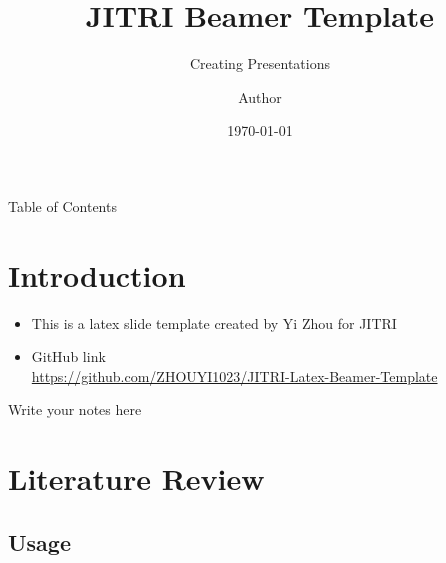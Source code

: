 \documentclass{libs/JITRI_format}
\title[JITRI Beamer Template]{\huge\textbf{JITRI Beamer Template}}
\subtitle{Creating Presentations}
\author{Author}
\institute[JITRI]{
    \normalsize{\email{author@xxx.xxx.xx}}
    \newline
    \department{Institute of Deep Perception Technology}
    \newline
    \university{Jiangsu Industrial Technology Research Institute}
}
\date{\today}
\begin{document}


\begin{frame}{}
    \maketitle
\end{frame}

\begin{frame}{Table of Contents}
    \begin{multicols}{2}
        \tableofcontents
    \end{multicols}
\end{frame}

\section{Introduction}

\begin{frame}
    \begin{itemize}[<+-| alert@+>] %
    	\item This is a latex slide template created by Yi Zhou for JITRI
        \item GitHub link \\ \url{https://github.com/ZHOUYI1023/JITRI-Latex-Beamer-Template}
    \end{itemize}
    
    \begin{note}
        {Write your notes here}
    \end{note}
\end{frame}

\section{Literature Review}

\subsection{Usage}
\end{document}
